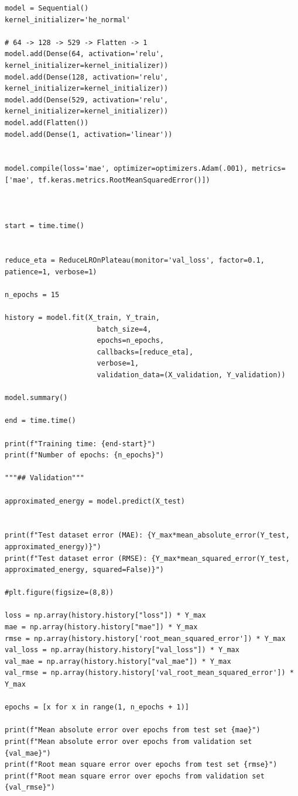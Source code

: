 \documentclass[a4paper,oneside,openright,11pt]{book}
\begin{document}
\begin{lstlisting}
model = Sequential()
kernel_initializer='he_normal'

# 64 -> 128 -> 529 -> Flatten -> 1
model.add(Dense(64, activation='relu', kernel_initializer=kernel_initializer))
model.add(Dense(128, activation='relu', kernel_initializer=kernel_initializer))
model.add(Dense(529, activation='relu', kernel_initializer=kernel_initializer))
model.add(Flatten())
model.add(Dense(1, activation='linear'))


model.compile(loss='mae', optimizer=optimizers.Adam(.001), metrics=['mae', tf.keras.metrics.RootMeanSquaredError()])



start = time.time()


reduce_eta = ReduceLROnPlateau(monitor='val_loss', factor=0.1, patience=1, verbose=1)

n_epochs = 15

history = model.fit(X_train, Y_train,
                      batch_size=4,
                      epochs=n_epochs, 
                      callbacks=[reduce_eta],
                      verbose=1,
                      validation_data=(X_validation, Y_validation))

model.summary()

end = time.time()

print(f"Training time: {end-start}")
print(f"Number of epochs: {n_epochs}")

"""## Validation"""

approximated_energy = model.predict(X_test)


print(f"Test dataset error (MAE): {Y_max*mean_absolute_error(Y_test, approximated_energy)}")
print(f"Test dataset error (RMSE): {Y_max*mean_squared_error(Y_test, approximated_energy, squared=False)}")

#plt.figure(figsize=(8,8))

loss = np.array(history.history["loss"]) * Y_max
mae = np.array(history.history["mae"]) * Y_max
rmse = np.array(history.history['root_mean_squared_error']) * Y_max
val_loss = np.array(history.history["val_loss"]) * Y_max
val_mae = np.array(history.history["val_mae"]) * Y_max
val_rmse = np.array(history.history['val_root_mean_squared_error']) * Y_max

epochs = [x for x in range(1, n_epochs + 1)]

print(f"Mean absolute error over epochs from test set {mae}")
print(f"Mean absolute error over epochs from validation set {val_mae}")
print(f"Root mean square error over epochs from test set {rmse}")
print(f"Root mean square error over epochs from validation set {val_rmse}")


\end{lstlisting}
\end{document}
